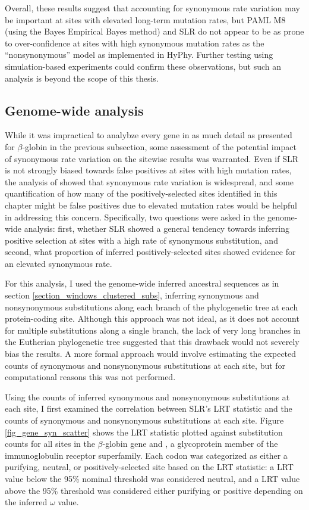 Overall, these results suggest that accounting for synonymous rate
variation may be important at sites with elevated long-term mutation
rates, but PAML M8 (using the Bayes Empirical Bayes method) and SLR do
not appear to be as prone to over-confidence at sites with high
synonymous mutation rates as the ``nonsynonymous'' model as
implemented in HyPhy. Further testing using simulation-based
experiments could confirm these observations, but such an analysis is
beyond the scope of this thesis.


\subsection{Genome-wide analysis}

While it was impractical to analybze every gene in as much detail as
presented for $\beta$-globin in the previous subsection, some
assessment of the potential impact of synonymous rate variation on the
sitewise results was warranted. Even if SLR is not strongly biased
towards false positives at sites with high mutation rates, the
analysis of \citet{Pond2005b} showed that synonymous rate variation is
widespread, and some quantification of how many of the
positively-selected sites identified in this chapter might be false
positives due to elevated mutation rates would be helpful in
addressing this concern. Specifically, two questions were asked in the
genome-wide analysis: first, whether SLR showed a general tendency
towards inferring positive selection at sites with a high rate of
synonymous substitution, and second, what proportion of inferred
positively-selected sites showed evidence for an elevated synonymous
rate.

For this analysis, I used the genome-wide inferred ancestral sequences
as in section \ref{section_windows_clustered_subs}, inferring
synonymous and nonsynonymous substitutions along each branch of the
phylogenetic tree at each protein-coding site. Although this approach
was not ideal, as it does not account for multiple substitutions along
a single branch, the lack of very long branches in the Eutherian
phylogenetic tree suggested that this drawback would not severely bias
the results. A more formal approach would involve estimating the
expected counts of synonymous and nonsynonymous substitutions at each
site, but for computational reasons this was not performed.

Using the counts of inferred synonymous and nonsynonymous
substitutions at each site, I first examined the correlation between
SLR's LRT statistic and the counts of synonymous and nonsynonymous
substitutions at each site. Figure \ref{fig_gene_syn_scatter} shows the LRT statistic plotted
against substitution counts for all sites in the $\beta$-globin gene
and , a glycoprotein member of the immunoglobulin receptor
superfamily. Each codon was categorized as either a purifying,
neutral, or positively-selected site based on the LRT statistic: a LRT
value below the 95\% nominal threshold was considered neutral, and a
LRT value above the 95\% threshold was considered either purifying or
positive depending on the inferred $\omega$ value.

